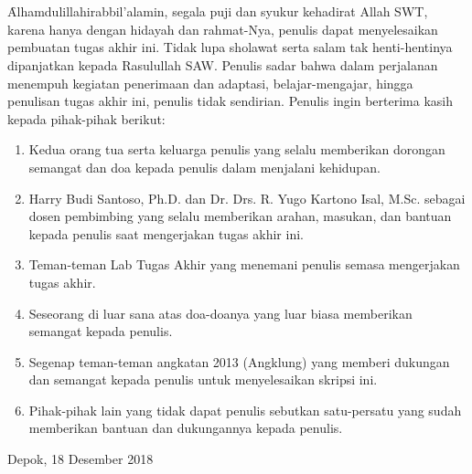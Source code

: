 \chapter*{\kataPengantar}
\f{Alhamdulillahirabbil'alamin}, segala puji dan syukur kehadirat Allah SWT, karena hanya dengan hidayah dan rahmat-Nya, penulis dapat menyelesaikan pembuatan tugas akhir ini. Tidak lupa sholawat serta salam tak henti-hentinya dipanjatkan kepada Rasulullah SAW. Penulis sadar bahwa dalam perjalanan menempuh kegiatan penerimaan dan adaptasi, belajar-mengajar, hingga penulisan tugas akhir ini, penulis tidak sendirian. Penulis ingin berterima kasih kepada pihak-pihak berikut: 
\begin{enumerate}
	\item Kedua orang tua serta keluarga penulis yang selalu memberikan dorongan semangat dan doa kepada penulis dalam menjalani kehidupan.
	\item Harry Budi Santoso, Ph.D. dan Dr. Drs. R. Yugo Kartono Isal, M.Sc.
	sebagai dosen pembimbing yang selalu memberikan arahan, masukan, dan bantuan kepada penulis saat mengerjakan tugas akhir ini.
	\item Teman-teman Lab Tugas Akhir yang menemani penulis semasa mengerjakan tugas akhir.
	\item Seseorang di luar sana atas doa-doanya yang luar biasa memberikan semangat kepada penulis.
	\item Segenap teman-teman angkatan 2013 (Angklung) yang memberi dukungan dan semangat kepada penulis untuk menyelesaikan skripsi ini.
	\item Pihak-pihak lain yang tidak dapat penulis sebutkan satu-persatu yang sudah memberikan bantuan dan dukungannya kepada penulis.
	
	
\end{enumerate}
\begin{flushright}
Depok, 18 Desember 2018\\[0.1cm]
\vspace*{1cm}
\penulis

\end{flushright}